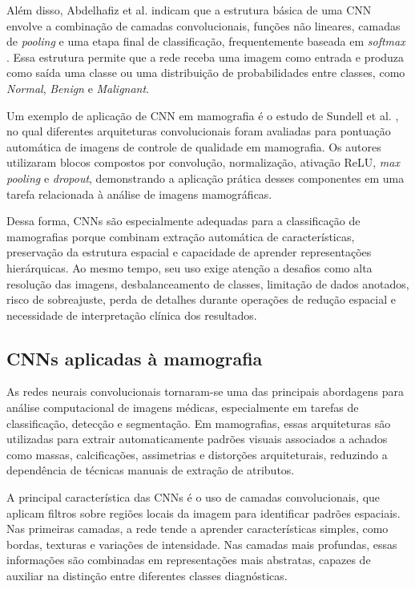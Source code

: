 \documentclass[
    12pt,
    openright,
    oneside,
    a4paper,
    english,
    brazil
]{abntex2}
\begin{document}
Além disso, Abdelhafiz et al. indicam que a estrutura básica de uma CNN envolve a combinação de camadas convolucionais, funções não lineares, camadas de \textit{pooling} e uma etapa final de classificação, frequentemente baseada em \textit{softmax} \cite{abdelhafiz2019}. Essa estrutura permite que a rede receba uma imagem como entrada e produza como saída uma classe ou uma distribuição de probabilidades entre classes, como \textit{Normal}, \textit{Benign} e \textit{Malignant}.

Um exemplo de aplicação de CNN em mamografia é o estudo de Sundell et al. \cite{sundell2022cnn}, no qual diferentes arquiteturas convolucionais foram avaliadas para pontuação automática de imagens de controle de qualidade em mamografia. Os autores utilizaram blocos compostos por convolução, normalização, ativação ReLU, \textit{max pooling} e \textit{dropout}, demonstrando a aplicação prática desses componentes em uma tarefa relacionada à análise de imagens mamográficas.

Dessa forma, CNNs são especialmente adequadas para a classificação de mamografias porque combinam extração automática de características, preservação da estrutura espacial e capacidade de aprender representações hierárquicas. Ao mesmo tempo, seu uso exige atenção a desafios como alta resolução das imagens, desbalanceamento de classes, limitação de dados anotados, risco de sobreajuste, perda de detalhes durante operações de redução espacial e necessidade de interpretação clínica dos resultados.

\subsection{CNNs aplicadas à mamografia}

As redes neurais convolucionais tornaram-se uma das principais abordagens para análise computacional de imagens médicas, especialmente em tarefas de classificação, detecção e segmentação. Em mamografias, essas arquiteturas são utilizadas para extrair automaticamente padrões visuais associados a achados como massas, calcificações, assimetrias e distorções arquiteturais, reduzindo a dependência de técnicas manuais de extração de atributos.

A principal característica das CNNs é o uso de camadas convolucionais, que aplicam filtros sobre regiões locais da imagem para identificar padrões espaciais. Nas primeiras camadas, a rede tende a aprender características simples, como bordas, texturas e variações de intensidade. Nas camadas mais profundas, essas informações são combinadas em representações mais abstratas, capazes de auxiliar na distinção entre diferentes classes diagnósticas.
\end{document}
